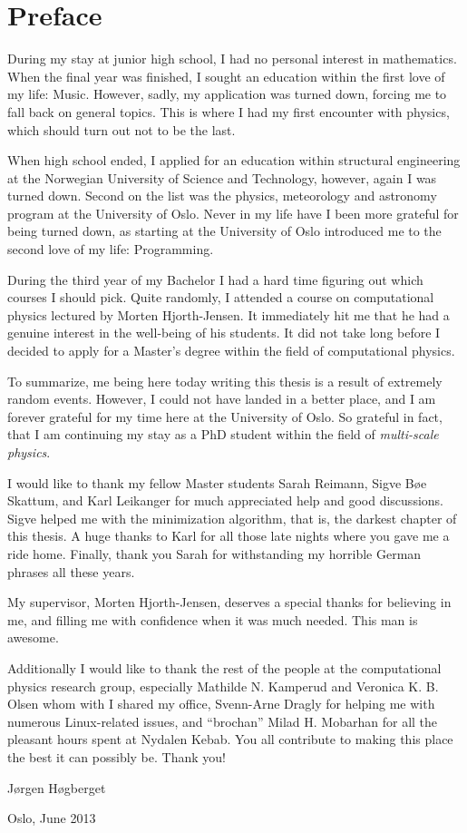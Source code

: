 \chapter*{Preface}

During my stay at junior high school, I had no personal interest in mathematics. When the final year was finished, I sought an education within the first love of my life: Music. However, sadly, my application was turned down, forcing me to fall back on general topics. This is where I had my first encounter with physics, which should turn out not to be the last.

When high school ended, I applied for an education within structural engineering at the Norwegian University of Science and Technology, however, again I was turned down. Second on the list was the physics, meteorology and astronomy program at the University of Oslo. Never in my life have I been more grateful for being turned down, as starting at the University of Oslo introduced me to the second love of my life: Programming. 

During the third year of my Bachelor I had a hard time figuring out which courses I should pick. Quite randomly, I attended a course on computational physics lectured by Morten Hjorth-Jensen. It immediately hit me that he had a genuine interest in the well-being of his students. It did not take long before I decided to apply for a Master's degree within the field of computational physics.

To summarize, me being here today writing this thesis is a result of extremely random events. However, I could not have landed in a better place, and I am forever grateful for my time here at the University of Oslo. So grateful in fact, that I am continuing my stay as a PhD student within the field of \textit{multi-scale physics}.

I would like to thank my fellow Master students Sarah Reimann, Sigve B\o{}e Skattum, and Karl Leikanger for much appreciated help and good discussions. Sigve helped me with the minimization algorithm, that is, the darkest chapter of this thesis. A huge thanks to Karl for all those late nights where you gave me a ride home. Finally, thank you Sarah for withstanding my horrible German phrases all these years. 

My supervisor, Morten Hjorth-Jensen, deserves a special thanks for believing in me, and filling me with confidence when it was much needed. This man is awesome.  

Additionally I would like to thank the rest of the people at the computational physics research group, especially Mathilde N. Kamperud and Veronica K. B. Olsen whom with I shared my office, Svenn-Arne Dragly for helping me with numerous Linux-related issues, and ``brochan'' Milad H. Mobarhan for all the pleasant hours spent at Nydalen Kebab. You all contribute to making this place the best it can possibly be. Thank you!


\hfill J\o{}rgen H\o{}gberget

Oslo, June 2013